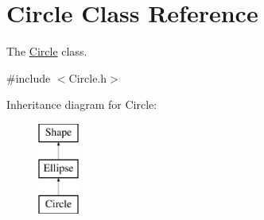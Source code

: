\hypertarget{class_circle}{}\section{Circle Class Reference}
\label{class_circle}


The \hyperlink{class_circle}{Circle} class.  




{\ttfamily \#include $<$Circle.\+h$>$}

Inheritance diagram for Circle\+:\begin{figure}[H]
\begin{center}
\leavevmode
\includegraphics[height=3.000000cm]{class_circle}
\end{center}
\end{figure}

